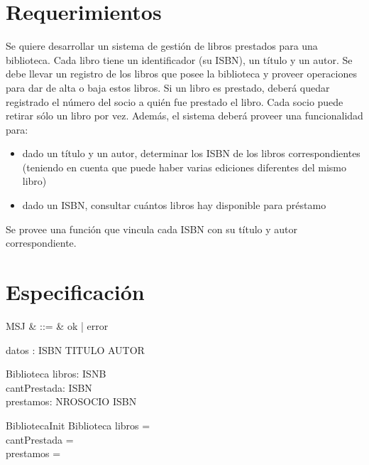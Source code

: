 \documentclass{article}
\begin{document}
\section{Requerimientos}
Se quiere desarrollar un sistema de gestión de libros prestados para una biblioteca. Cada libro tiene un identificador (su ISBN), un título y un autor. Se debe llevar un registro de los libros que posee la biblioteca y proveer operaciones para dar de alta o baja estos libros. Si un libro es prestado, deberá quedar registrado el número del socio a quién fue prestado el libro. Cada socio puede retirar sólo un libro por vez.
Además, el sistema deberá proveer una funcionalidad para:
\begin{itemize}
    \item dado un título y un autor, determinar los ISBN de los libros correspondientes (teniendo en cuenta que puede haber varias ediciones diferentes del mismo libro)
    \item dado un ISBN, consultar cuántos libros hay disponible para préstamo
\end{itemize}
Se provee una función que vincula cada ISBN con su título y autor correspondiente.

\section{Especificación}

\begin{zed}
\end{zed}

\begin{syntax}
MSJ & ::= & ok | error
\end{syntax}

\begin{axdef}
datos : ISBN \pfun TITULO \cross AUTOR
\end{axdef}

\begin{schema}{Biblioteca}
libros: ISNB \pfun \nat \\
cantPrestada: ISBN \pfun \nat \\
prestamos: NROSOCIO \pfun ISBN
\end{schema}

\begin{schema}{BibliotecaInit}
Biblioteca
\where
libros = \emptyset \\
cantPrestada = \emptyset \\
prestamos = \emptyset
\end{schema}
\end{document}

